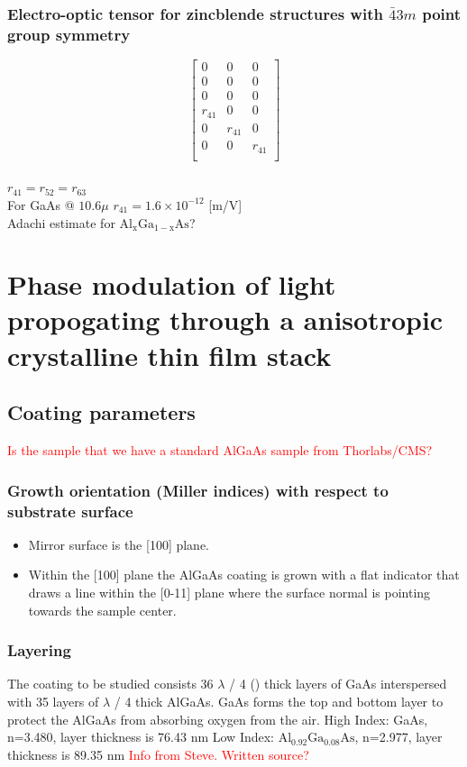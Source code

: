 \subsubsection{Electro-optic tensor for zincblende structures with $\bar{4}3m$ point group symmetry}
\begin{equation}
 \left[ {\begin{array}{ccc}
   0 & 0 & 0\\
   0 & 0 & 0\\
   0 & 0 & 0\\
   r_{41} & 0 & 0\\
   0 & r_{41} & 0\\
   0 & 0 & r_{41}\\
  \end{array} } \right]
\end{equation}
\\
$r_{41} = r_{52} = r_{63}$
\\
For GaAs @ $10.6\mu$ $r_{41} = 1.6 \times 10^{-12}$ [m/V]
\\
Adachi estimate for $\mathrm{Al_{x}Ga_{1-x}As}$?



\section{Phase modulation of light propogating through a anisotropic crystalline thin film stack}

\subsection{Coating parameters}

\textcolor{red}{Is the sample that we have a standard AlGaAs sample from Thorlabs/CMS?}


\subsubsection{Growth orientation (Miller indices) with respect to substrate surface}
\begin{itemize}
\item Mirror surface is the [100] plane.
\item Within the [100] plane the AlGaAs coating is grown with a flat indicator that draws a line within the [0-11] plane where the surface normal is pointing towards the sample center.
\end{itemize}


\subsubsection{Layering}
The coating to be studied consists 36 $\lambda$ / 4 () thick layers of GaAs interspersed with 35 layers of $\lambda$ / 4 thick AlGaAs.   GaAs forms the top and bottom layer to protect the AlGaAs from absorbing oxygen from the air.
High Index:  GaAs, n=3.480, layer thickness is 76.43 nm
Low Index:  $ \mathrm{Al}_{0.92} \mathrm{Ga}_{0.08} \mathrm{As} $, n=2.977, layer thickness is 89.35 nm
\textcolor{red}{Info from Steve. Written source?}



